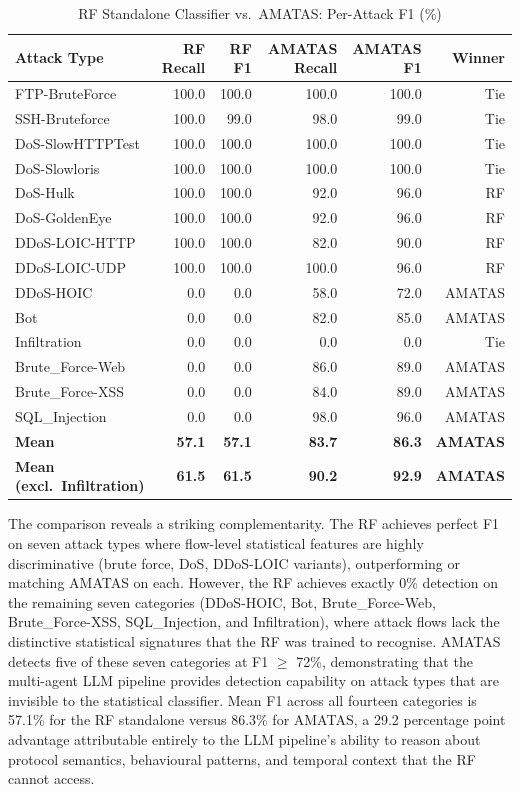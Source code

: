 \documentclass[../main.tex]{subfiles}
\begin{document}
\begin{table}[H]
\centering
\caption{RF Standalone Classifier vs.\ AMATAS: Per-Attack F1 (\%)}
\label{tab:rf-baseline}
\small
\begin{tabular}{l r r r r r}
\toprule
Attack Type & RF Recall & RF F1 & AMATAS Recall & AMATAS F1 & Winner \\
\midrule
FTP-BruteForce & 100.0 & 100.0 & 100.0 & 100.0 & Tie \\
SSH-Bruteforce & 100.0 & 99.0 & 98.0 & 99.0 & Tie \\
DoS-SlowHTTPTest & 100.0 & 100.0 & 100.0 & 100.0 & Tie \\
DoS-Slowloris & 100.0 & 100.0 & 100.0 & 100.0 & Tie \\
DoS-Hulk & 100.0 & 100.0 & 92.0 & 96.0 & RF \\
DoS-GoldenEye & 100.0 & 100.0 & 92.0 & 96.0 & RF \\
DDoS-LOIC-HTTP & 100.0 & 100.0 & 82.0 & 90.0 & RF \\
DDoS-LOIC-UDP & 100.0 & 100.0 & 100.0 & 96.0 & RF \\
DDoS-HOIC & 0.0 & 0.0 & 58.0 & 72.0 & AMATAS \\
Bot & 0.0 & 0.0 & 82.0 & 85.0 & AMATAS \\
Infiltration & 0.0 & 0.0 & 0.0 & 0.0 & Tie \\
Brute\_Force-Web & 0.0 & 0.0 & 86.0 & 89.0 & AMATAS \\
Brute\_Force-XSS & 0.0 & 0.0 & 84.0 & 89.0 & AMATAS \\
SQL\_Injection & 0.0 & 0.0 & 98.0 & 96.0 & AMATAS \\
\midrule
\textbf{Mean} & \textbf{57.1} & \textbf{57.1} & \textbf{83.7} & \textbf{86.3} & \textbf{AMATAS} \\
\textbf{Mean (excl.\ Infiltration)} & \textbf{61.5} & \textbf{61.5} & \textbf{90.2} & \textbf{92.9} & \textbf{AMATAS} \\
\bottomrule
\end{tabular}
\end{table}

The comparison reveals a striking complementarity. The RF achieves perfect F1 on seven attack types where flow-level statistical features are highly discriminative (brute force, DoS, DDoS-LOIC variants), outperforming or matching AMATAS on each. However, the RF achieves exactly 0\% detection on the remaining seven categories (DDoS-HOIC, Bot, Brute\_Force-Web, Brute\_Force-XSS, SQL\_Injection, and Infiltration), where attack flows lack the distinctive statistical signatures that the RF was trained to recognise. AMATAS detects five of these seven categories at F1 $\geq$ 72\%, demonstrating that the multi-agent LLM pipeline provides detection capability on attack types that are invisible to the statistical classifier. Mean F1 across all fourteen categories is 57.1\% for the RF standalone versus 86.3\% for AMATAS, a 29.2 percentage point advantage attributable entirely to the LLM pipeline's ability to reason about protocol semantics, behavioural patterns, and temporal context that the RF cannot access.
\end{document}
